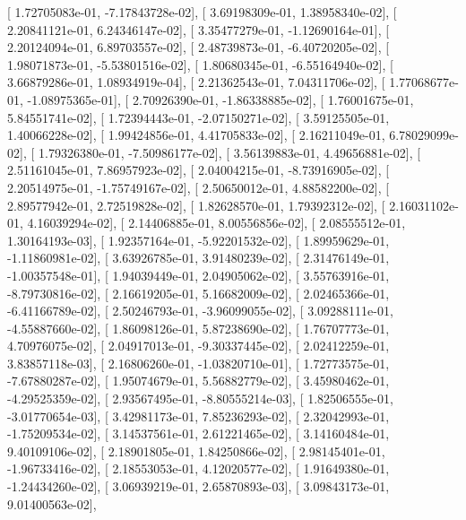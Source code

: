 \documentclass{article}
\begin{document}
       [  1.72705083e-01,  -7.17843728e-02],
       [  3.69198309e-01,   1.38958340e-02],
       [  2.20841121e-01,   6.24346147e-02],
       [  3.35477279e-01,  -1.12690164e-01],
       [  2.20124094e-01,   6.89703557e-02],
       [  2.48739873e-01,  -6.40720205e-02],
       [  1.98071873e-01,  -5.53801516e-02],
       [  1.80680345e-01,  -6.55164940e-02],
       [  3.66879286e-01,   1.08934919e-04],
       [  2.21362543e-01,   7.04311706e-02],
       [  1.77068677e-01,  -1.08975365e-01],
       [  2.70926390e-01,  -1.86338885e-02],
       [  1.76001675e-01,   5.84551741e-02],
       [  1.72394443e-01,  -2.07150271e-02],
       [  3.59125505e-01,   1.40066228e-02],
       [  1.99424856e-01,   4.41705833e-02],
       [  2.16211049e-01,   6.78029099e-02],
       [  1.79326380e-01,  -7.50986177e-02],
       [  3.56139883e-01,   4.49656881e-02],
       [  2.51161045e-01,   7.86957923e-02],
       [  2.04004215e-01,  -8.73916905e-02],
       [  2.20514975e-01,  -1.75749167e-02],
       [  2.50650012e-01,   4.88582200e-02],
       [  2.89577942e-01,   2.72519828e-02],
       [  1.82628570e-01,   1.79392312e-02],
       [  2.16031102e-01,   4.16039294e-02],
       [  2.14406885e-01,   8.00556856e-02],
       [  2.08555512e-01,   1.30164193e-03],
       [  1.92357164e-01,  -5.92201532e-02],
       [  1.89959629e-01,  -1.11860981e-02],
       [  3.63926785e-01,   3.91480239e-02],
       [  2.31476149e-01,  -1.00357548e-01],
       [  1.94039449e-01,   2.04905062e-02],
       [  3.55763916e-01,  -8.79730816e-02],
       [  2.16619205e-01,   5.16682009e-02],
       [  2.02465366e-01,  -6.41166789e-02],
       [  2.50246793e-01,  -3.96099055e-02],
       [  3.09288111e-01,  -4.55887660e-02],
       [  1.86098126e-01,   5.87238690e-02],
       [  1.76707773e-01,   4.70976075e-02],
       [  2.04917013e-01,  -9.30337445e-02],
       [  2.02412259e-01,   3.83857118e-03],
       [  2.16806260e-01,  -1.03820710e-01],
       [  1.72773575e-01,  -7.67880287e-02],
       [  1.95074679e-01,   5.56882779e-02],
       [  3.45980462e-01,  -4.29525359e-02],
       [  2.93567495e-01,  -8.80555214e-03],
       [  1.82506555e-01,  -3.01770654e-03],
       [  3.42981173e-01,   7.85236293e-02],
       [  2.32042993e-01,  -1.75209534e-02],
       [  3.14537561e-01,   2.61221465e-02],
       [  3.14160484e-01,   9.40109106e-02],
       [  2.18901805e-01,   1.84250866e-02],
       [  2.98145401e-01,  -1.96733416e-02],
       [  2.18553053e-01,   4.12020577e-02],
       [  1.91649380e-01,  -1.24434260e-02],
       [  3.06939219e-01,   2.65870893e-03],
       [  3.09843173e-01,   9.01400563e-02],
\end{document}
